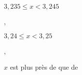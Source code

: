 \documentclass[a4paper,10 pt]{article}
\begin{document}
  
\begin{alterqcm}[symb = \dingsquare, lq=6cm]
{{\begin{minipage}[t]{\linewidth-1cm}$3,235\leqslant x <3,245$\\
  \end{minipage}} ,
 {\begin{minipage}[t]{\linewidth-1cm} $3,24\leqslant x <3,25$\\
  \end{minipage}} ,
 {\begin{minipage}[t]{\linewidth-1cm}
     $x$ est plus près de  que de 
  \end{minipage}}}
\end{alterqcm}
\end{document}

